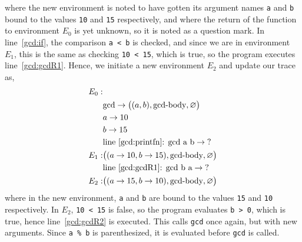 where the new environment is noted to have gotten its argument names \lstinline!a! and \lstinline!b! bound to the values \lstinline!10! and \lstinline!15! respectively, and where the return of the function to environment $E_0$ is yet unknown, so it is noted as a question mark. In line~\ref{gcd:if}, the comparison \lstinline!a < b! is checked, and since we are in environment $E_1$, this is the same as checking \lstinline!10 < 15!, which is true, so the program executes line~\ref{gcd:gcdR1}. Hence, we initiate a new environment $E_2$ and update our trace as,
\begin{align*}
  E_0:&\\
      & \text{gcd} \rightarrow \big((a, b), \text{gcd-body}, \varnothing\big)\\
      & a \rightarrow 10\\
      & b \rightarrow 15\\
      & \text{line~\ref{gcd:printfn}: gcd a b} \rightarrow \text{?}\\
  E_1:& \big((a \rightarrow 10, b \rightarrow 15), \text{gcd-body}, \varnothing\big)\\
      & \text{line~\ref{gcd:gcdR1}: gcd b a} \rightarrow \text{?}\\
  E_2:& \big((a \rightarrow 15, b \rightarrow 10), \text{gcd-body}, \varnothing\big)\\
\end{align*}
where in the new environment, \lstinline!a! and \lstinline!b! are bound to the values \lstinline!15! and \lstinline!10! respectively. In $E_2$, \lstinline!10 < 15! is false, so the program evaluates \lstinline!b > 0!, which is true, hence line~\ref{gcd:gcdR2} is executed. This calls \lstinline!gcd! once again, but with new arguments. Since \lstinline{a % b} is parenthesized, it is evaluated before \lstinline!gcd! is called. 

